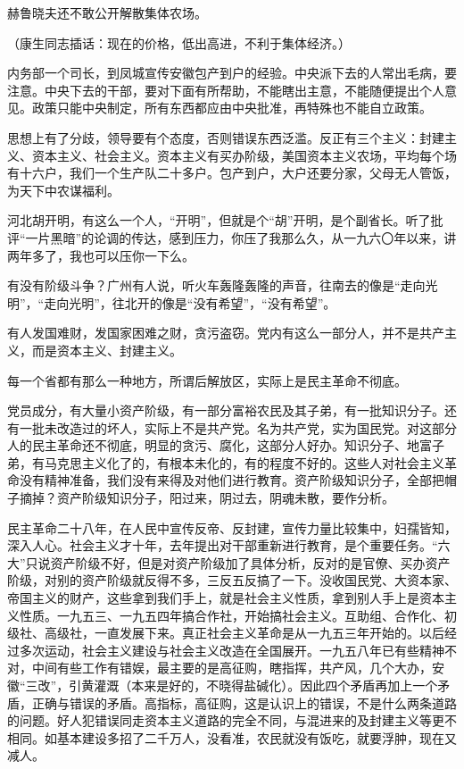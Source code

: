 赫鲁晓夫还不敢公开解散集体农场。

（康生同志插话：现在的价格，低出高进，不利于集体经济。）

内务部一个司长，到凤城宣传安徽包产到户的经验。中央派下去的人常出毛病，要注意。中央下去的干部，要对下面有所帮助，不能瞎出主意，不能随便提出个人意见。政策只能中央制定，所有东西都应由中央批准，再特殊也不能自立政策。

思想上有了分歧，领导要有个态度，否则错误东西泛滥。反正有三个主义：封建主义、资本主义、社会主义。资本主义有买办阶级，美国资本主义农场，平均每个场有十六户，我们一个生产队二十多户。包产到户，大户还要分家，父母无人管饭，为天下中农谋福利。

河北胡开明，有这么一个人，“开明”，但就是个“胡”开明，是个副省长。听了批评“一片黑暗”的论调的传达，感到压力，你压了我那么久，从一九六〇年以来，讲两年多了，我也可以压你一下么。

有没有阶级斗争？广州有人说，听火车轰隆轰隆的声音，往南去的像是“走向光明”，“走向光明”，往北开的像是“没有希望”，“没有希望”。

有人发国难财，发国家困难之财，贪污盗窃。党内有这么一部分人，并不是共产主义，而是资本主义、封建主义。

每一个省都有那么一种地方，所谓后解放区，实际上是民主革命不彻底。

党员成分，有大量小资产阶级，有一部分富裕农民及其子弟，有一批知识分子。还有一批未改造过的坏人，实际上不是共产党。名为共产党，实为国民党。对这部分人的民主革命还不彻底，明显的贪污、腐化，这部分人好办。知识分子、地富子弟，有马克思主义化了的，有根本未化的，有的程度不好的。这些人对社会主义革命没有精神准备，我们没有来得及对他们进行教育。资产阶级知识分子，全部把帽子摘掉？资产阶级知识分子，阳过来，阴过去，阴魂未散，要作分析。

民主革命二十八年，在人民中宣传反帝、反封建，宣传力量比较集中，妇孺皆知，深入人心。社会主义才十年，去年提出对干部重新进行教育，是个重要任务。“六大”只说资产阶级不好，但是对资产阶级加了具体分析，反对的是官僚、买办资产阶级，对别的资产阶级就反得不多，三反五反搞了一下。没收国民党、大资本家、帝国主义的财产，这些拿到我们手上，就是社会主义性质，拿到别人手上是资本主义性质。一九五三、一九五四年搞合作社，开始搞社会主义。互助组、合作化、初级社、高级社，一直发展下来。真正社会主义革命是从一九五三年开始的。以后经过多次运动，社会主义建设与社会主义改造在全国展开。一九五八年已有些精神不对，中间有些工作有错娱，最主要的是高征购，瞎指挥，共产风，几个大办，安徽“三改”，引黄灌溉（本来是好的，不晓得盐碱化）。因此四个矛盾再加上一个矛盾，正确与错误的矛盾。高指标，高征购，这是认识上的错误，不是什么两条道路的问题。好人犯错误同走资本主义道路的完全不同，与混进来的及封建主义等更不相同。如基本建设多招了二千万人，没看准，农民就没有饭吃，就要浮肿，现在又减人。

